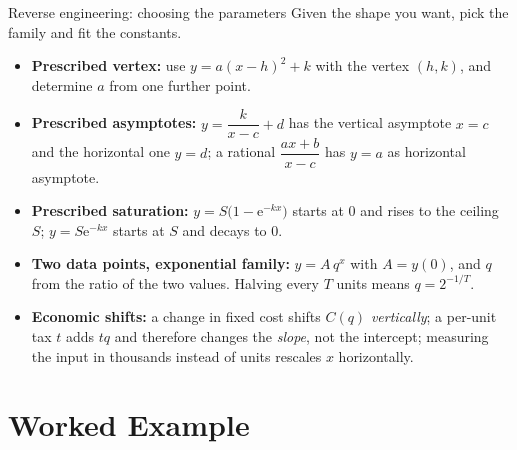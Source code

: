 \begin{rulebox}{Reverse engineering: choosing the parameters}
Given the shape you want, pick the family and fit the constants.
\begin{itemize}[leftmargin=1.6em,itemsep=0.3ex]
  \item \textbf{Prescribed vertex:} use $y=a(x-h)^{2}+k$ with the vertex
        $(h,k)$, and determine $a$ from one further point.
  \item \textbf{Prescribed asymptotes:} $y=\dfrac{k}{x-c}+d$ has the
        vertical asymptote $x=c$ and the horizontal one $y=d$; a rational
        $\dfrac{ax+b}{x-c}$ has $y=a$ as horizontal asymptote.
  \item \textbf{Prescribed saturation:} $y=S\bigl(1-\mathrm{e}^{-kx}\bigr)$
        starts at $0$ and rises to the ceiling $S$; $y=S\mathrm{e}^{-kx}$
        starts at $S$ and decays to $0$.
  \item \textbf{Two data points, exponential family:} $y=A\,q^{x}$ with
        $A=y(0)$, and $q$ from the ratio of the two values. Halving every
        $T$ units means $q=2^{-1/T}$.
  \item \textbf{Economic shifts:} a change in fixed cost shifts $C(q)$
        \emph{vertically}; a per-unit tax $t$ adds $tq$ and therefore
        changes the \emph{slope}, not the intercept; measuring the input in
        thousands instead of units rescales $x$ horizontally.
\end{itemize}
\end{rulebox}

\section{Worked Example}


